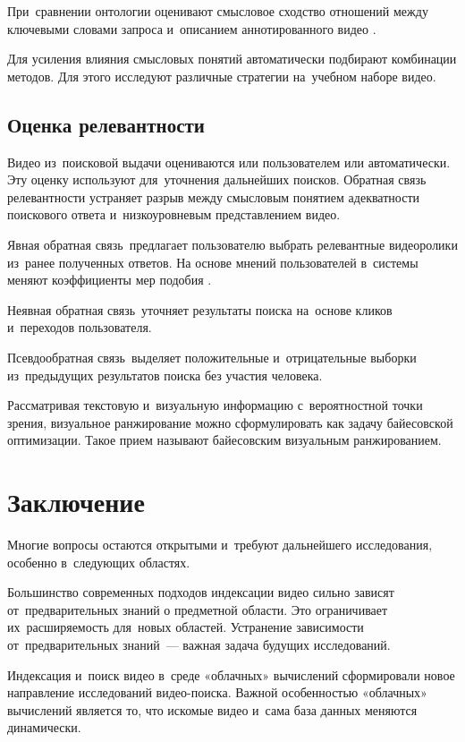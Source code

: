 При~сравнении онтологии оценивают смысловое сходство
отношений между ключевыми словами запроса
и~описанием аннотированного видео \cite{Aytar:2008}.

Для усиления влияния смысловых понятий
автоматически подбирают комбинации методов.
Для этого исследуют различные стратегии на~учебном наборе видео.

\subsection{Оценка релевантности}

Видео из~поисковой выдачи оцениваются или пользователем или автоматически.
Эту оценку используют для~уточнения дальнейших поисков.
Обратная связь релевантности устраняет разрыв между смысловым понятием
адекватности поискового ответа и~низкоуровневым представлением видео.

Явная обратная связь\ предлагает пользователю выбрать
релевантные видеоролики из~ранее полученных ответов.
На основе мнений пользователей в~системы меняют коэффициенты
мер подобия \cite{Chen:2008:a}.

Неявная обратная связь\ уточняет результаты поиска
на~основе кликов и~переходов пользователя.

Псевдообратная связь\
выделяет положительные и~отрицательные выборки
из~предыдущих результатов поиска без участия человека.

Рассматривая текстовую и~визуальную информацию
с~вероятностной точки зрения, визуальное ранжирование
можно сформулировать как задачу байесовской оптимизации.
Такое прием называют байесовским визуальным ранжированием.


\section{Заключение}

Многие вопросы остаются открытыми и~требуют дальнейшего исследования,
особенно в~следующих областях.

Большинство современных подходов индексации видео
сильно зависят от~предварительных знаний о предметной области.
Это ограничивает их~расширяемость для~новых областей.
Устранение зависимости от~предварительных знаний~—
важная задача будущих исследований.

Индексация и~поиск видео в~среде «облачных» вычислений сформировали
новое направление исследований видео-поиска.
Важной особенностью «облачных» вычислений является то,
что искомые видео и~сама база данных меняются динамически.


